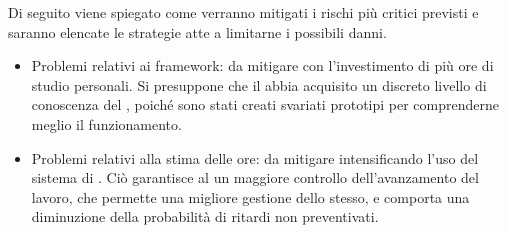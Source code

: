 \label{mRisk3}
Di seguito viene spiegato come verranno mitigati i rischi più critici previsti e saranno elencate le strategie atte a limitarne i possibili danni.
\begin{itemize}
\item{Problemi relativi ai framework:} da mitigare con l'investimento di più ore di studio personali. Si presuppone che il  abbia acquisito un discreto livello di conoscenza del , poiché sono stati creati svariati prototipi per comprenderne meglio il funzionamento.
\item{Problemi relativi alla stima delle ore:} da mitigare intensificando l'uso del sistema di . Ciò garantisce al \rRP un maggiore controllo dell'avanzamento del lavoro, che permette una migliore gestione dello stesso, e comporta una diminuzione della probabilità di ritardi non preventivati.
\end{itemize}
